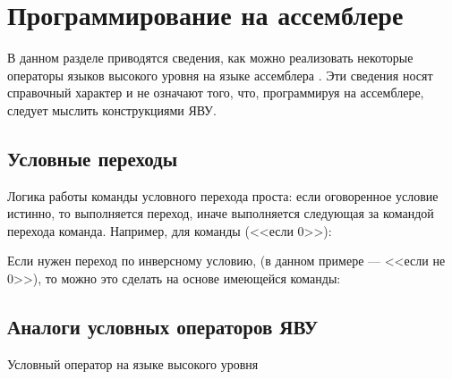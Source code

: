 \section{Программирование на ассемблере \MyProc}
\label{ch::programming}

В данном разделе приводятся сведения, как можно реализовать некоторые операторы языков высокого уровня на языке ассемблера {\MyProc}. Эти сведения носят справочный характер и не означают того, что, программируя на ассемблере, следует мыслить конструкциями ЯВУ.


\subsection{Условные переходы}

Логика работы команды условного перехода проста: если оговоренное условие истинно, то выполняется переход, иначе выполняется следующая за командой перехода команда. Например, для команды  (<<если 0>>):
\begin{algorithmic}[1]
    \STATE{}
     
\end{algorithmic}

Если нужен переход по инверсному условию, (в данном примере  --- <<если не 0>>), то можно это сделать на основе имеющейся команды:
\begin{algorithmic}[1]
     
    \STATE{}
     
\end{algorithmic}


\subsection{Аналоги условных операторов ЯВУ}

Условный оператор на языке высокого уровня
\begin{algorithmic}[1]
        \STATE{} 
    \ELSE
        \STATE{} 
    \ENDIF
\end{algorithmic}

